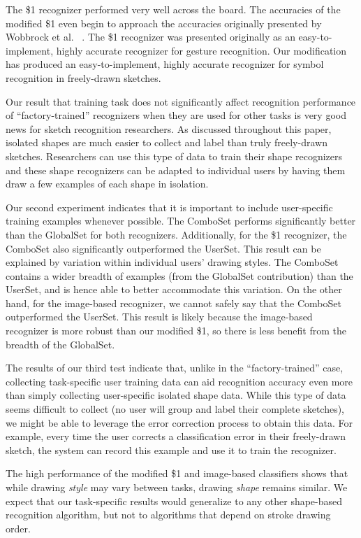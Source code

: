 \documentclass[final,5p,twocolumn]{elsarticle}
\begin{document}
The \$1 recognizer performed very well across the board. The
accuracies of the modified \$1 even begin to approach the accuracies
originally presented by Wobbrock et al.~ \cite{dollar}.  The \$1
recognizer was presented originally as an easy-to-implement, highly
accurate recognizer for gesture recognition.  Our modification has
produced an easy-to-implement, highly accurate recognizer for symbol
recognition in freely-drawn sketches.

Our result that training task does not significantly affect recognition
performance of ``factory-trained'' recognizers when they are used for other tasks is very good
news for sketch recognition researchers.  As discussed throughout this
paper, isolated shapes are much easier to collect and label than truly
freely-drawn sketches.  Researchers can use this type of data to train
their shape recognizers and these shape recognizers can be adapted to
individual users by having them draw a few examples of each
shape in isolation.

Our second experiment indicates that it is important to include
user-specific training examples whenever possible.  The ComboSet
performs significantly better than the GlobalSet for both recognizers.
Additionally, for the \$1 recognizer, the ComboSet also significantly
outperformed the UserSet. This result can be explained by variation
within individual users' drawing styles. The ComboSet contains a wider
breadth of examples (from the GlobalSet contribution) than the
UserSet, and is hence able to better accommodate this variation. On
the other hand, for the image-based recognizer, we cannot safely say
that the ComboSet outperformed the UserSet. This result is likely
because the image-based recognizer is more robust than our modified
\$1, so there is less benefit from the breadth of the GlobalSet.

The results of our third test indicate that, unlike in the ``factory-trained'' case,
collecting task-specific
user training data can aid recognition accuracy even more than simply collecting
user-specific isolated shape data.  While this
type of data seems difficult to collect (no user will group and label
their complete sketches), we might be able to leverage the error
correction process to obtain this data.  For example, every time the
user corrects a classification error in their freely-drawn sketch, the
system can record this example and use it to train the recognizer.

The high performance of the modified \$1 and image-based classifiers
shows that while drawing \textit{style} may vary between tasks,
drawing \textit{shape} remains similar.  We expect that our
task-specific results would generalize to any other shape-based
recognition algorithm, but not to algorithms that depend on stroke
drawing order.
\end{document}
